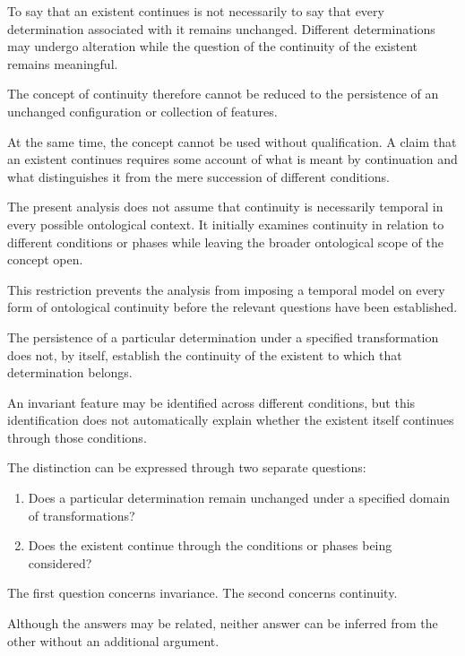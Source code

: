To say that an existent continues is not necessarily
to say that every determination associated with it
remains unchanged. Different determinations may
undergo alteration while the question of the
continuity of the existent remains meaningful.

The concept of continuity therefore cannot be
reduced to the persistence of an unchanged
configuration or collection of features.

At the same time, the concept cannot be used
without qualification. A claim that an existent
continues requires some account of what is meant
by continuation and what distinguishes it from
the mere succession of different conditions.

The present analysis does not assume that
continuity is necessarily temporal in every
possible ontological context. It initially
examines continuity in relation to different
conditions or phases while leaving the broader
ontological scope of the concept open.

This restriction prevents the analysis from
imposing a temporal model on every form of
ontological continuity before the relevant
questions have been established.


The persistence of a particular determination
under a specified transformation does not,
by itself, establish the continuity of the
existent to which that determination belongs.

An invariant feature may be identified across
different conditions, but this identification
does not automatically explain whether the
existent itself continues through those
conditions.

The distinction can be expressed through
two separate questions:

\begin{enumerate}
    \item Does a particular determination
    remain unchanged under a specified
    domain of transformations?

    \item Does the existent continue through
    the conditions or phases being considered?
\end{enumerate}

The first question concerns invariance.
The second concerns continuity.

Although the answers may be related, neither
answer can be inferred from the other without
an additional argument.

